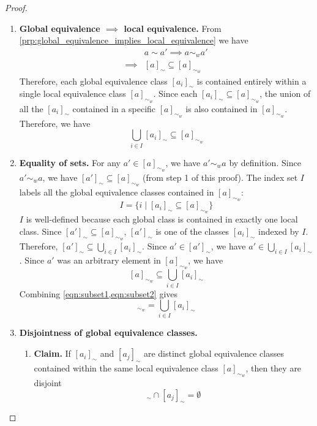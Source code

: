 \begin{proof}
\begin{enumerate}[(1)]
    \item \textbf{Global equivalence $\implies$ local equivalence.}
    From \cref{prp:global_equivalence_implies_local_equivalence} we have
    \begin{align}
        & a \sim a' \implies a \sim_{w} a' \\
        \implies & [a]_{\sim} \subseteq [a]_{\sim_{w}}
    \end{align}
    Therefore, each global equivalence class $[a_{i}]_{\sim}$ is contained entirely within a single local equivalence class $[a]_{\sim_{w}}$.
    Since each $[a_{i}]_{\sim} \subseteq [a]_{\sim_{w}}$, the union of all the $[a_{i}]_{\sim}$ contained in a specific $[a]_{\sim_{w}}$ is also contained in $[a]_{\sim_{w}}$.
    Therefore, we have
    \begin{equation}\label{eqn:subset1}
        \bigcup_{i \in I}[a_{i}]_{\sim} \subseteq [a]_{\sim_{w}}
    \end{equation}

    \item \textbf{Equality of sets.}
    For any $a' \in [a]_{\sim_{w}}$, we have $a' \sim_{w} a$ by definition.
    Since $a' \sim_{w} a$, we have $[a']_{\sim} \subseteq [a]_{\sim_{w}}$ (from step 1 of this proof).
    The index set $I$ labels all the global equivalence classes contained in $[a]_{\sim_{w}}$:
    \begin{equation}
        I = \{ i \mid [a_{i}]_{\sim} \subseteq [a]_{\sim_{w}} \}
    \end{equation}
    $I$ is well-defined because each global class is contained in exactly one local class.
    Since $[a']_{\sim} \subseteq [a]_{\sim_{w}}$, $[a']_{\sim}$ is one of the classes $[a_{i}]_{\sim}$ indexed by $I$.
    Therefore, $[a']_{\sim} \subseteq \bigcup_{i \in I}[a_{i}]_{\sim}$.
    Since $a' \in [a']_{\sim}$, we have $a' \in \bigcup_{i \in I}[a_{i}]_{\sim}$.
    Since $a'$ was an arbitrary element in $[a]_{\sim_{w}}$, we have
    \begin{equation}\label{eqn:subset2}
        [a]_{\sim_{w}} \subseteq \bigcup_{i \in I}[a_{i}]_{\sim}
    \end{equation}
    Combining \cref{eqn:subset1,eqn:subset2} gives
    \begin{equation}
        [a]_{\sim_{w}} = \bigcup_{i \in I}[a_{i}]_{\sim}
    \end{equation}
    
    \item \textbf{Disjointness of global equivalence classes.}
    \begin{enumerate}
        \item \textbf{Claim.}
        If $[a_{i}]_{\sim}$ and $[a_{j}]_{\sim}$ are distinct global equivalence classes contained within the same local equivalence class $[a]_{\sim_{w}}$, then they are disjoint
        \begin{equation}
            [a_{i}]_{\sim} \cap [a_{j}]_{\sim} = \emptyset
        \end{equation}


\end{enumerate}
\end{enumerate}
\end{proof}
